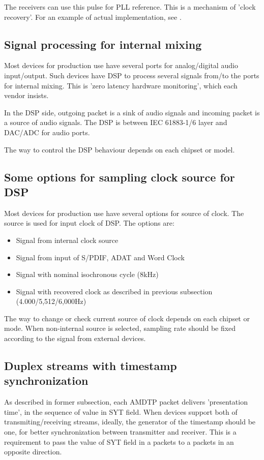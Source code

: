 \documentclass[onecolumn]{article}
\begin{document}
The receivers can use this pulse for PLL reference. This is a mechanism of 'clock recovery'. For an example of actual implementation, see \cite{icelynx}.


\subsection{Signal processing for internal mixing}
\label{sec:internal-mixing}

Most devices for production use have several ports for analog/digital audio input/output. Such devices have DSP to process several signals from/to the ports for internal mixing. This is 'zero latency hardware monitoring', which each vendor insists.

In the DSP side, outgoing packet is a sink of audio signals and incoming packet is a source of audio signals. The DSP is between IEC 61883-1/6 layer and DAC/ADC for audio ports.

The way to control the DSP behaviour depends on each chipset or model.

\subsection{Some options for sampling clock source for DSP}

Most devices for production use have several options for source of clock. The source is used for input clock of DSP. The options are:
\begin{itemize}
	\item Signal from internal clock source
	\item Signal from input of S/PDIF, ADAT and Word Clock
	\item Signal with nominal isochronous cycle (8kHz)
	\item Signal with recovered clock as described in previous subsection (4.000/5,512/6,000Hz)
\end{itemize}

The way to change or check current source of clock depends on each chipset or mode. When non-internal source is selected, sampling rate should be fixed according to the signal from external devices.

\subsection{Duplex streams with timestamp synchronization}
\label{sec:duplex-streams}

As described in former subsection, each AMDTP packet delivers 'presentation time', in the sequence of value in SYT field. When devices support both of transmiting/receiving streams, ideally, the generator of the timestamp should be one, for better synchronization between transmitter and receiver. This is a requirement to pass the value of SYT field in a packets to a packets in an opposite direction.
\end{document}
